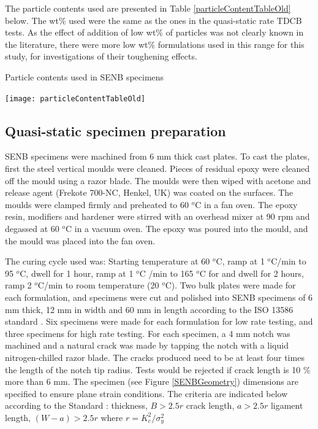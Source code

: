 \documentclass[numbers=noendperiod,chapterprefix=on]{icldt} %
\begin{document}
The particle contents used are presented in Table \ref{particleContentTableOld} below. The wt\% used were the same as the ones in the quasi-static rate TDCB tests. As the effect of addition of low wt\% of particles was not clearly known in the literature, there were more low wt\% formulations used in this range for this study, for investigations of their toughening effects.   

\begin{table}[!htpb]
\centering
\caption{Particle contents used in SENB specimens} \label{particleContentTableOld}
\texttt{[image: particleContentTableOld]}
\end{table}
\FloatBarrier

\subsection{Quasi-static specimen preparation} \label{Quasi_static_specimen_preparation}
SENB specimens were machined from 6 mm thick cast plates. To cast the plates, first the steel vertical moulds were cleaned. Pieces of residual epoxy were cleaned off the mould using a razor blade. The moulds were then wiped with acetone and release agent (Frekote 700-NC, Henkel, UK) was coated on the surfaces. The moulds were clamped firmly and preheated to 60 $^o$C in a fan oven. 
The epoxy resin, modifiers and hardener were stirred with an overhead mixer at 90 rpm and degassed at 60 $^o$C in a vacuum oven. The epoxy was poured into the mould, and the mould was placed into the fan oven.

The curing cycle used was: Starting temperature at 60 $^o$C, ramp at 1 $^o$C/min to 95 $^o$C, dwell for 1 hour, ramp at 1 $^o$C /min to 165 $^o$C for and dwell for 2 hours, ramp 2 $^o$C/min to room temperature (20 $^o$C).
Two bulk plates were made for each formulation, and specimens were cut and polished into SENB specimens of 6 mm thick, 12 mm in width and 60 mm in length according to the ISO 13586 standard \cite{ISO13586}. Six specimens were made for each formulation for low rate testing, and three specimens for high rate testing. 
For each specimen, a 4 mm notch was machined and a natural crack was made by tapping the notch with a liquid nitrogen-chilled razor blade. The cracks produced need to be at least four times the length of the notch tip radius. Tests would be rejected if crack length is 10 \% more than 6 mm.
The specimen (see Figure \ref{SENBGeometry}) dimensions are specified to ensure plane strain conditions. The criteria are indicated below according to the Standard \cite{ISO13586}:
\newline
thickness, $ B > 2.5 r$
\newline
crack length, $a > 2.5 r$
\newline
ligament length, $(W - a) > 2.5 r$
\newline
where $r = K_c^2/\sigma _{y}^2 $
\end{document}
